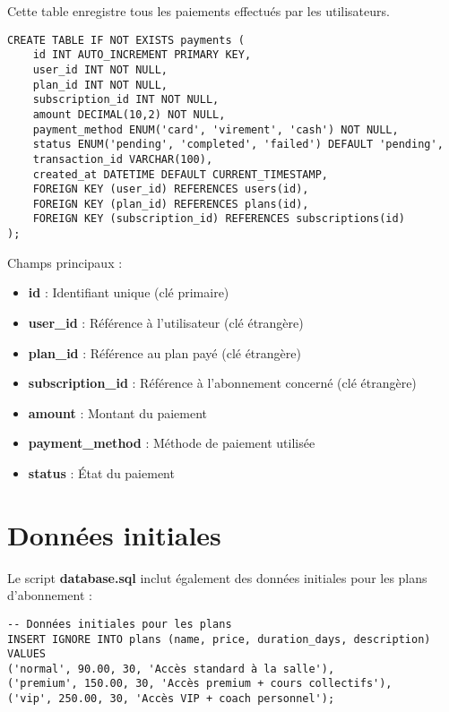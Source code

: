 \documentclass[12pt,a4paper]{report}
\begin{document}
Cette table enregistre tous les paiements effectués par les utilisateurs.

\begin{lstlisting}[style=sqlStyle, caption=Structure de la table payments]
CREATE TABLE IF NOT EXISTS payments (
    id INT AUTO_INCREMENT PRIMARY KEY,
    user_id INT NOT NULL,
    plan_id INT NOT NULL,
    subscription_id INT NOT NULL,
    amount DECIMAL(10,2) NOT NULL,
    payment_method ENUM('card', 'virement', 'cash') NOT NULL,
    status ENUM('pending', 'completed', 'failed') DEFAULT 'pending',
    transaction_id VARCHAR(100),
    created_at DATETIME DEFAULT CURRENT_TIMESTAMP,
    FOREIGN KEY (user_id) REFERENCES users(id),
    FOREIGN KEY (plan_id) REFERENCES plans(id),
    FOREIGN KEY (subscription_id) REFERENCES subscriptions(id)
);
\end{lstlisting}

Champs principaux :
\begin{itemize}
    \item \textbf{id} : Identifiant unique (clé primaire)
    \item \textbf{user\_id} : Référence à l'utilisateur (clé étrangère)
    \item \textbf{plan\_id} : Référence au plan payé (clé étrangère)
    \item \textbf{subscription\_id} : Référence à l'abonnement concerné (clé étrangère)
    \item \textbf{amount} : Montant du paiement
    \item \textbf{payment\_method} : Méthode de paiement utilisée
    \item \textbf{status} : État du paiement
\end{itemize}

\section{Données initiales}

Le script \textbf{database.sql} inclut également des données initiales pour les plans d'abonnement :

\begin{lstlisting}[style=sqlStyle, caption=Données initiales pour les plans]
-- Données initiales pour les plans
INSERT IGNORE INTO plans (name, price, duration_days, description) VALUES
('normal', 90.00, 30, 'Accès standard à la salle'),
('premium', 150.00, 30, 'Accès premium + cours collectifs'),
('vip', 250.00, 30, 'Accès VIP + coach personnel');
\end{lstlisting}
\end{document}
